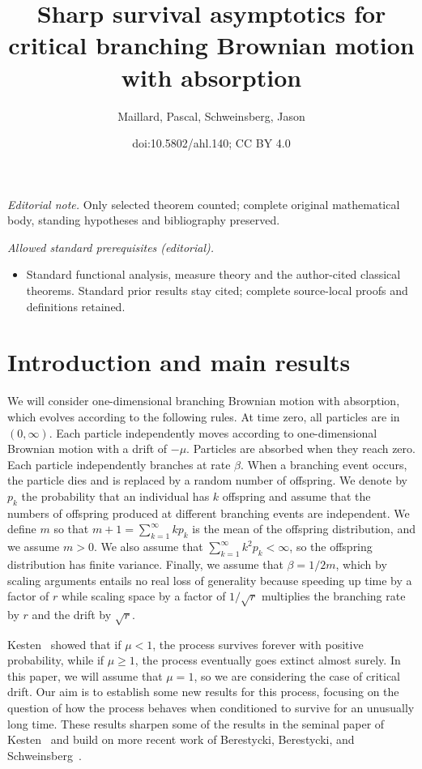 \documentclass[10pt]{amsart}
\title{Sharp survival asymptotics for critical branching Brownian motion with absorption}
\author{Maillard, Pascal, Schweinsberg, Jason}
\date{doi:10.5802/ahl.140; CC BY 4.0}
\theoremstyle{definition}\newtheorem{defi}[theo]{Definition}\newtheorem{rema}[theo]{Remark}\newtheorem{exam}[theo]{Example}\newtheorem{exem}[theo]{Example}\newtheorem{nota}[theo]{Notation}
\newcommand{\1} {\mathds{1}}
\begin{document}
\maketitle
\noindent\textit{Editorial note.} Only selected theorem counted; complete original mathematical body, standing hypotheses and bibliography preserved.\par\medskip
\noindent\textit{Allowed standard prerequisites (editorial).}\begin{itemize}
\item Standard functional analysis, measure theory and the author-cited classical theorems. Standard prior results stay cited; complete source-local proofs and definitions retained.
\end{itemize}\medskip

\section{Introduction and main results}

We will consider one-dimensional branching Brownian motion with absorption, which evolves according to the following rules. At time zero, all particles are in $(0, \infty)$. Each particle independently moves according to one-dimensional Brownian motion with a drift of $-\mu$. Particles are absorbed when they reach zero. Each particle independently branches at rate $\beta$. When a branching event occurs, the particle dies and is replaced by a random number of offspring. We denote by $p_k$ the probability that an individual has $k$ offspring and assume that the numbers of offspring produced at different branching events are independent. We define $m$ so that $m + 1 = \sum_{k=1}^{\infty} kp_k$ is the mean of the offspring distribution, and we assume $m > 0$. We also assume that $\sum_{k=1}^{\infty} k^2 p_k < \infty$, so the offspring distribution has finite variance. Finally, we assume that $\beta = 1/2m$, which by scaling arguments entails no real loss of generality because speeding up time by a factor of $r$ while scaling space by a factor of $1/\sqrt{r}$ multiplies the branching rate by $r$ and the drift by $\sqrt{r}$.

Kesten~\cite{kesten} showed that if $\mu < 1$, the process survives forever with positive probability, while if $\mu \geq 1$, the process eventually goes extinct almost surely. In this paper, we will assume that $\mu = 1$, so we are considering the case of critical drift. Our aim is to establish some new results for this process, focusing on the question of how the process behaves when conditioned to survive for an unusually long time. These results sharpen some of the results in the seminal paper of Kesten~\cite{kesten} and build on more recent work of Berestycki, Berestycki, and Schweinsberg~\cite{bbs, bbs3}.
\end{document}
